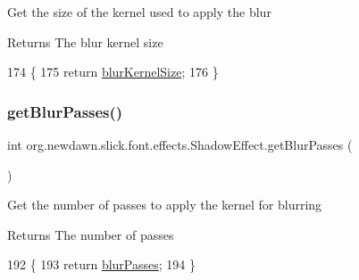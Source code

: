 Get the size of the kernel used to apply the blur

\begin{DoxyReturn}{Returns}
The blur kernel size 
\end{DoxyReturn}

\begin{DoxyCode}
174                                    \{
175         \textcolor{keywordflow}{return} \mbox{\hyperlink{classorg_1_1newdawn_1_1slick_1_1font_1_1effects_1_1_shadow_effect_a9383b2ba78f68f6302bfd9e9cb5de0f0}{blurKernelSize}};
176     \}
\end{DoxyCode}
\mbox{\label{classorg_1_1newdawn_1_1slick_1_1font_1_1effects_1_1_shadow_effect_ab29cf47f2596caa1a129b8d70700db93}} 
\subsubsection{\texorpdfstring{get\+Blur\+Passes()}{getBlurPasses()}}
{\footnotesize\ttfamily int org.\+newdawn.\+slick.\+font.\+effects.\+Shadow\+Effect.\+get\+Blur\+Passes (\begin{DoxyParamCaption}{ }\end{DoxyParamCaption})\hspace{0.3cm}{\ttfamily [inline]}}

Get the number of passes to apply the kernel for blurring

\begin{DoxyReturn}{Returns}
The number of passes 
\end{DoxyReturn}

\begin{DoxyCode}
192                                \{
193         \textcolor{keywordflow}{return} \mbox{\hyperlink{classorg_1_1newdawn_1_1slick_1_1font_1_1effects_1_1_shadow_effect_ae7079addc56e471f5c8747ffc8397a92}{blurPasses}};
194     \}
\end{DoxyCode}
\mbox{\label{classorg_1_1newdawn_1_1slick_1_1font_1_1effects_1_1_shadow_effect_a3d8ff47299ece9d528f81e0ea9ef9cba}} 
